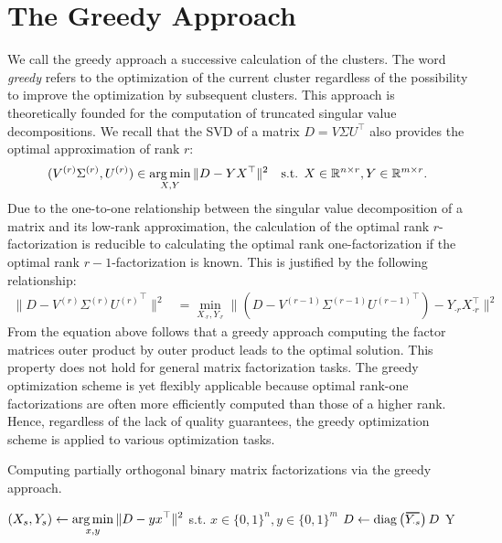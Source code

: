 \section{The Greedy Approach}\label{sec:ZS:GreedyApproach}
We call the greedy approach a successive calculation of the clusters. The word \emph{greedy} refers to the optimization of the current cluster regardless of the possibility to improve the optimization by subsequent clusters. This approach is theoretically founded for the computation of truncated singular value decompositions. 
We recall that the SVD of a matrix $D=V\Sigma U^\top$ also provides the optimal approximation of rank $r$:
\begin{align*}
     (V^{(r)}\Sigma^{(r)},U^{(r)})&\in\operatorname*{arg\,min}_{X,Y}\|D-YX^\top\|^2 &\text{s.t. } X\in\mathbb{R}^{n\times r}, Y\in\mathbb{R}^{m\times r}.
\end{align*}
Due to the one-to-one relationship between the singular value decomposition of a matrix and its low-rank approximation, the calculation of the optimal rank $r$-factorization is reducible to calculating the optimal rank one-factorization if the optimal rank $r-1$-factorization is known. This is justified by the following relationship:  
\begin{align*}
\|D-V^{(r)}\Sigma^{(r)}{U^{(r)}}^\top\|^2
     &= \min_{X_{\cdot r},Y_{\cdot r}} \|(D-V^{(r-1)}\Sigma^{(r-1)}{U^{(r-1)}}^\top)-Y_{\cdot r}X_{\cdot r}^\top\|^2
\end{align*}
From the equation above follows that a greedy approach computing the factor matrices outer product by outer product leads to the optimal solution. This property does not hold for general matrix factorization tasks. The greedy optimization scheme is yet flexibly applicable because optimal rank-one factorizations are often more efficiently computed than those of a higher rank. Hence, regardless of the lack  of quality guarantees, the greedy optimization scheme is applied to various optimization tasks.
\begin{algorithm}[t]
\caption{Computing partially orthogonal binary matrix factorizations via the greedy approach.} 
\begin{algorithmic}[1]
    	\State $\displaystyle(X_s,Y_s)\gets \operatorname*{arg\,min}_{x,y} \|D-yx^\top\|^2 $ \hfill s.t. $x\in\{0,1\}^n,y\in\{0,1\}^m$
    	\label{alg:greedy:opt}
    	\State $D\gets \diag\left(\thickbar{Y_{\cdot s}}\right)D$ \label{alg:greedy:reduce}
    \EndFor
    \State \Return Y
  \EndFunction
\end{algorithmic}
\label{alg:greedy}
\end{algorithm}

